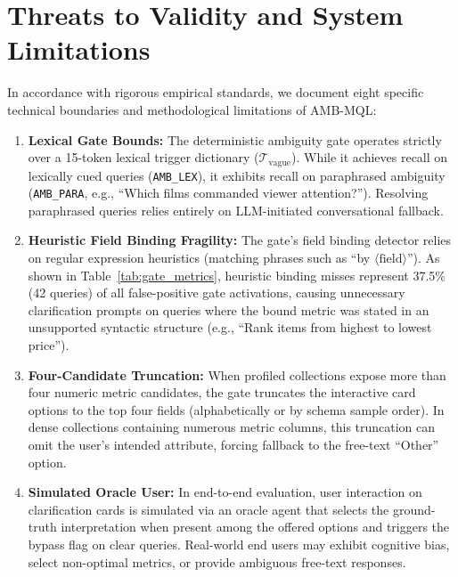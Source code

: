 \section{Threats to Validity and System Limitations}
\label{sec:limitations}

In accordance with rigorous empirical standards, we document eight specific technical boundaries and methodological limitations of AMB-MQL:

\begin{enumerate}
    \item \textbf{Lexical Gate Bounds:} The deterministic ambiguity gate operates strictly over a 15-token lexical trigger dictionary ($\mathcal{T}_{\text{vague}}$). While it achieves \gateRecallLexical{} recall on lexically cued queries (\texttt{AMB\_LEX}), it exhibits \gateRecallParaphrase{} recall on paraphrased ambiguity (\texttt{AMB\_PARA}, e.g., ``Which films commanded viewer attention?''). Resolving paraphrased queries relies entirely on LLM-initiated conversational fallback.
    
    \item \textbf{Heuristic Field Binding Fragility:} The gate's field binding detector relies on regular expression heuristics (matching phrases such as ``by $\langle\text{field}\rangle$''). As shown in Table~\ref{tab:gate_metrics}, heuristic binding misses represent 37.5\% (42 queries) of all false-positive gate activations, causing unnecessary clarification prompts on queries where the bound metric was stated in an unsupported syntactic structure (e.g., ``Rank items from highest to lowest price'').
    
    \item \textbf{Four-Candidate Truncation:} When profiled collections expose more than four numeric metric candidates, the gate truncates the interactive card options to the top four fields (alphabetically or by schema sample order). In dense collections containing numerous metric columns, this truncation can omit the user's intended attribute, forcing fallback to the free-text ``Other'' option.
    
    \item \textbf{Simulated Oracle User:} In end-to-end evaluation, user interaction on clarification cards is simulated via an oracle agent that selects the ground-truth interpretation when present among the offered options and triggers the bypass flag on clear queries. Real-world end users may exhibit cognitive bias, select non-optimal metrics, or provide ambiguous free-text responses.
    

\end{enumerate}

